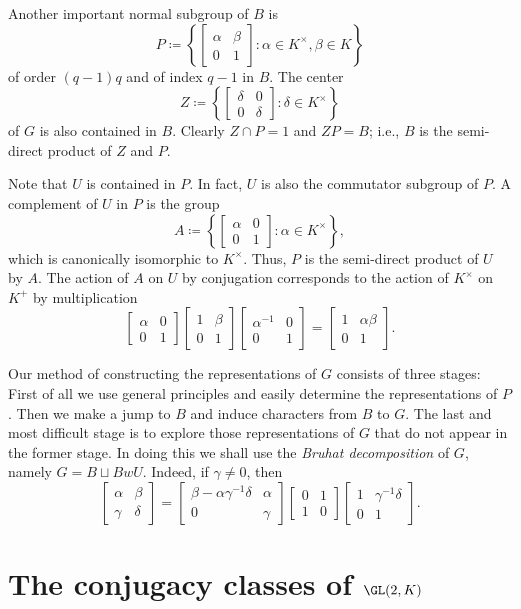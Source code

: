 \documentclass[../main.tex]{subfiles}
\begin{document}
Another important normal subgroup of $B$ is
\[P\coloneqq\left\{\begin{bmatrix}
	\alpha & \beta \\
	0 & 1
\end{bmatrix}:\alpha\in K^\times,\beta\in K\right\}\]
of order $(q-1)q$ and of index $q-1$ in $B$. The center
\[Z\coloneqq\left\{\begin{bmatrix}
	\delta & 0 \\
	0 & \delta
\end{bmatrix}:\delta\in K^\times\right\}\]
of $G$ is also contained in $B$. Clearly $Z\cap P=1$ and $ZP=B$; i.e., $B$ is the semi-direct product of $Z$ and $P$.

Note that $U$ is contained in $P$. In fact, $U$ is also the commutator subgroup of $P$. A complement of $U$ in $P$ is the group
\[A\coloneqq\left\{\begin{bmatrix}
	\alpha & 0 \\
	0 & 1
\end{bmatrix}:\alpha\in K^\times\right\},\]
which is canonically isomorphic to $K^\times$. Thus, $P$ is the semi-direct product of $U$ by $A$. The action of $A$ on $U$ by conjugation corresponds to the action of $K^\times$ on $K^+$ by multiplication
\[\begin{bmatrix}
	\alpha & 0 \\
	0 & 1
\end{bmatrix}\begin{bmatrix}
	1 & \beta \\
	0 & 1
\end{bmatrix}\begin{bmatrix}
	\alpha^{-1} & 0 \\
	0 & 1
\end{bmatrix}=\begin{bmatrix}
	1 & \alpha\beta \\
	0 & 1
\end{bmatrix}.\]

Our method of constructing the representations of $G$ consists of three stages: First of all we use general principles and easily determine the representations of $P$. Then we make a jump to $B$ and induce characters from $B$ to $G$. The last and most difficult stage is to explore those representations of $G$ that do not appear in the former stage. In doing this we shall use the \textit{Bruhat decomposition} of $G$, namely $G=B\sqcup BwU$. Indeed, if $\gamma\ne0$, then
\[\begin{bmatrix}
	\alpha & \beta \\
	\gamma & \delta
\end{bmatrix}=\begin{bmatrix}
	\beta-\alpha\gamma^{-1}\delta & \alpha \\
	0 & \gamma
\end{bmatrix}\begin{bmatrix}
	0 & 1 \\
	1 & 0
\end{bmatrix}\begin{bmatrix}
	1 & \gamma^{-1}\delta \\
	0 & 1
\end{bmatrix}.\]

\section{The conjugacy classes of \texorpdfstring{$\GL(2,K)$}{ GL(2,K)}}
\end{document}
